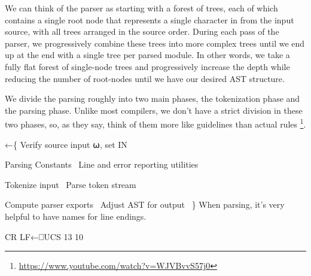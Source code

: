\documentclass{article}%
\begin{document}
\noindent
We can think of the parser as starting with a forest of trees, 
each of which contains a single root node that represents a single
character in from the input source,
with all trees arranged in the source order.
During each pass of the parser, we progressively combine these 
trees into more complex trees until we end up at the end with a 
single tree per parsed module.
In other words, we take a fully flat forest of single-node trees 
and progressively increase the depth while reducing the number of 
root-nodes until we have our desired AST structure.

We divide the parsing roughly into two main phases,
the tokenization phase and the parsing phase. 
Unlike most compilers, we don't have a strict division in these 
two phases, so, as they say, think of them more like guidelines
than actual rules%
\footnote{
        \href{https://www.youtube.com/watch?v=WJVBvvS57j0}
                {https://www.youtube.com/watch?v=WJVBvvS57j0}
}.

\nwenddocs{}\endmoddef\nwstartdeflinemarkup{}\nwenddeflinemarkup
{}←\{
        \LA{}Verify source input \code{}⍵\edoc{}, set \code{}IN\edoc{}~{\nwtagstyle{}}\RA{}
        
        \LA{}Parsing Constants~{\nwtagstyle{}}\RA{}
        \LA{}Line and error reporting utilities~{\nwtagstyle{}}\RA{}

        \LA{}Tokenize input~{\nwtagstyle{}}\RA{}
        \LA{}Parse token stream~{\nwtagstyle{}}\RA{}
        
        \LA{}Compute parser exports~{\nwtagstyle{}}\RA{}
        \LA{}Adjust AST for output~{\nwtagstyle{}}\RA{}
\}
\eatline
{}\nwendcode{}\nwdocspar
When parsing, it's very helpful to have names for line endings.

\nwenddocs{}\endmoddef\nwstartdeflinemarkup{}\nwenddeflinemarkup
CR LF←⎕UCS 13 10
\nwendcode{}\nwdocspar
\end{document}
